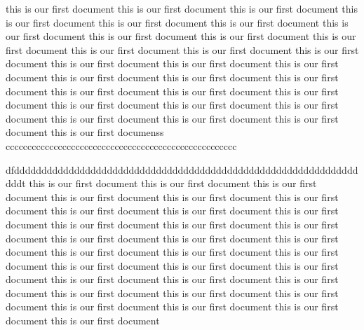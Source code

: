 \documentclass{article}
\begin{document}
this is our first document
this is our first document
this is our first document
this is our first document
this is our first document
this is our first document
this is our first document
this is our first document
this is our first document
this is our first document
this is our first document
this is our first document
this is our first document
this is our first document
this is our first document
this is our first document
this is our first document
this is our first document
this is our first document
this is our first document
this is our first document
this is our first document
this is our first document
this is our first document
this is our first document
this is our first document
this is our first document
this is our first document
this is our first documenss
ccccccccccccccccccccccccccccccccccccccccccccccccccccc













dfddddddddddddddddddddddddddddddddddddddddddddddddddddddddddddddddddt
this is our first document
this is our first document
this is our first document
this is our first document
this is our first document
this is our first document
this is our first document
this is our first document
this is our first document
this is our first document
this is our first document
this is our first document
this is our first document
this is our first document
this is our first document
this is our first document
this is our first document
this is our first document
this is our first document
this is our first document
this is our first document
this is our first document
this is our first document
this is our first document
this is our first document
this is our first document
this is our first document
this is our first document
this is our first document
this is our first document
this is our first document
\end{document}
